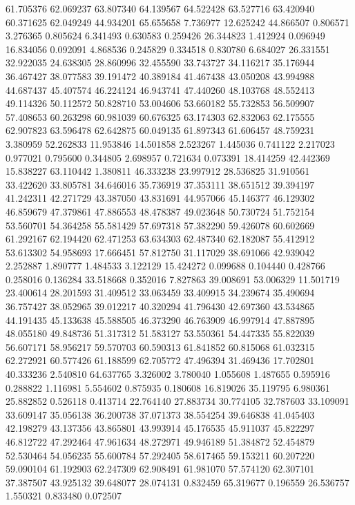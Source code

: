 61.705376
62.069237
63.807340
64.139567
64.522428
63.527716
63.420940
60.371625
62.049249
44.934201
65.655658
7.736977
12.625242
44.866507
0.806571
3.276365
0.805624
6.341493
0.630583
0.259426
26.344823
1.412924
0.096949
16.834056
0.092091
4.868536
0.245829
0.334518
0.830780
6.684027
26.331551
32.922035
24.638305
28.860996
32.455590
33.743727
34.116217
35.176944
36.467427
38.077583
39.191472
40.389184
41.467438
43.050208
43.994988
44.687437
45.407574
46.224124
46.943741
47.440260
48.103768
48.552413
49.114326
50.112572
50.828710
53.004606
53.660182
55.732853
56.509907
57.408653
60.263298
60.981039
60.676325
63.174303
62.832063
62.175555
62.907823
63.596478
62.642875
60.049135
61.897343
61.606457
48.759231
3.380959
52.262833
11.953846
14.501858
2.523267
1.445036
0.741122
2.217023
0.977021
0.795600
0.344805
2.698957
0.721634
0.073391
18.414259
42.442369
15.838227
63.110442
1.380811
46.333238
23.997912
28.536825
31.910561
33.422620
33.805781
34.646016
35.736919
37.353111
38.651512
39.394197
41.242311
42.271729
43.387050
43.831691
44.957066
45.146377
46.129302
46.859679
47.379861
47.886553
48.478387
49.023648
50.730724
51.752154
53.560701
54.364258
55.581429
57.697318
57.382290
59.426078
60.602669
61.292167
62.194420
62.471253
63.634303
62.487340
62.182087
55.412912
53.613302
54.958693
17.666451
57.812750
31.117029
38.691066
42.939042
2.252887
1.890777
1.484533
3.122129
15.424272
0.099688
0.104440
0.428766
0.258016
0.136284
33.518668
0.352016
7.827863
39.008691
53.006329
11.501719
23.400614
28.201593
31.409512
33.063459
33.409915
34.239674
35.490694
36.757427
38.052965
39.012217
40.320294
41.796430
42.697360
43.534865
44.191435
45.133638
45.588505
46.373290
46.763909
46.997914
47.887895
48.055180
49.848736
51.317312
51.583127
53.550361
54.447335
55.822039
56.607171
58.956217
59.570703
60.590313
61.841852
60.815068
61.032315
62.272921
60.577426
61.188599
62.705772
47.496394
31.469436
17.702801
40.333236
2.540810
64.637765
3.326002
3.780040
1.055608
1.487655
0.595916
0.288822
1.116981
5.554602
0.875935
0.180608
16.819026
35.119795
6.980361
25.882852
0.526118
0.413714
22.764140
27.883734
30.774105
32.787603
33.109091
33.609147
35.056138
36.200738
37.071373
38.554254
39.646838
41.045403
42.198279
43.137356
43.865801
43.993914
45.176535
45.911037
45.822297
46.812722
47.292464
47.961634
48.272971
49.946189
51.384872
52.454879
52.530464
54.056235
55.600784
57.292405
58.617465
59.153211
60.207220
59.090104
61.192903
62.247309
62.908491
61.981070
57.574120
62.307101
37.387507
43.925132
39.648077
28.074131
0.832459
65.319677
0.196559
26.536757
1.550321
0.833480
0.072507

